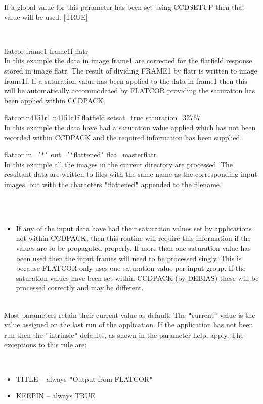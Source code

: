 \documentclass[twoside,11pt]{article}
\newcommand{\htmlref}[2]{#1}
\renewcommand{\_}{\texttt{\symbol{95}}}
\newcommand{\qt}[1]{{\tt "}#1{\tt "}}
\newcommand{\qs}[1]{{\tt '}#1{\tt '}}
\newcommand{\routine}[1]{{\sc #1}}
\newcommand{\xroutine}[1]{\htmlref{{\sc #1}}{#1}}
\newcommand{\sstexamples}[1]{
   \item[Examples:] \mbox{} \\
   \vspace{-3.5ex}
   \begin{description}
      #1
   \end{description}
}
\newcommand{\sstexamplesubsection}[2]{\sloppy \item{\ssttt #1} \mbox{} \\ #2 }
\newcommand{\sstnotes}[1]{\item[Notes:] \mbox{} \\[1.3ex] #1}
\newcommand{\sstdiytopic}[2]{\item[#1:] \mbox{} \\[1.3ex] #2}
\newcommand{\sstitemlist}[1]{
  \mbox{} \\
  \vspace{-3.5ex}
  \begin{itemize}
     #1
  \end{itemize}
}
\newcommand{\sstitem}{\item}
\newcommand{\sstexamples}[1]{
      \item[Examples:] \\
      \begin{description}
         #1
      \end{description}
      \\
   }
\newcommand{\sstexamplesubsection}[2]{\item[{\ssttt #1}] #2}
\newcommand{\sstnotes}[1]{\item[Notes:] #1 }
\newcommand{\sstdiytopic}[2]{\item[{#1}] #2 }
\newcommand{\sstitemlist}[1]{
      \begin{itemize}
         #1
      \end{itemize}
      \\
   }
\newcommand{\sstitem}{\item}
\begin{document}
{{{         If a global value for this parameter has been set using 
         CCDSETUP then that value will be used. 
         [TRUE]
      }
   }
   \sstexamples{
      \sstexamplesubsection{
         flatcor frame1 frame1\_f flatr
      } {
         In this example the data in image frame1 are corrected for the
         flatfield response stored in image flatr. The result of dividing
         FRAME1 by flatr is written to image frame1\_f. If a saturation
         value has been applied to the data in frame1 then this will be
         automatically accommodated by \routine{FLATCOR} providing the saturation
         has been applied within CCDPACK.
      }
      \sstexamplesubsection{
         flatcor n4151r1 n4151r1f flatfield setsat=true saturation=32767
      } {
         In this example the data have had a saturation value applied
         which has not been recorded within CCDPACK and the required
         information has been supplied.
      }
      \sstexamplesubsection{
         flatcor in=\qs{$*$} out=\qs{$*$\_flattened} flat=master\_flatr
      } {
         In this example all the images in the current directory are
         processed. The resultant data are written to files with the
         same name as the corresponding input images, but with the
         characters \qt{\_flattened} appended to the filename.
      }
   }
   \sstnotes{
      \sstitemlist{

         \sstitem
         If any of the input data have had their saturation values set by
           applications not within CCDPACK, then this routine will require
           this information if the values are to be propagated properly. If
           more than one saturation value has been used then the input
           frames will need to be processed singly. This is because \routine{FLATCOR}
           only uses one saturation value per input group. If the
           saturation values have been set within CCDPACK (by \xroutine{DEBIAS})
           these will be processed correctly and may be different.
      }
   }
   \sstdiytopic{
      Behaviour of parameters
   } {
      Most parameters retain their current value as default. The
      \qt{current} value is the value assigned on the last run of the
      application. If the application has not been run then the
      \qt{intrinsic} defaults, as shown in the parameter help, apply.
      The exceptions to this rule are:
      \sstitemlist{

         \sstitem
            TITLE   -- always \qt{Output from FLATCOR}

         \sstitem
            KEEPIN  -- always TRUE

}}}
\end{document}
